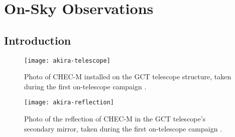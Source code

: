 \chapter{\label{ch8-onsky}On-Sky Observations} 

\minitoc


\section{Introduction}

\begin{figure}
  \texttt{[image: akira-telescope]}
  \caption[Photo of CHEC-M installed on the GCT telescope structure.]{Photo of CHEC-M installed on the GCT telescope structure, taken during the first on-telescope campaign \cite{akira-telescope}.}
  \label{fig:akira-telescope}
\end{figure}

\begin{figure}
  \texttt{[image: akira-reflection]}
  \caption[Photo of the reflection of CHEC-M in the secondary mirror.]{Photo of the reflection of CHEC-M in the GCT telescope's secondary mirror, taken during the first on-telescope campaign \cite{akira-reflection}.}
  \label{fig:akira-reflection}
\end{figure}

